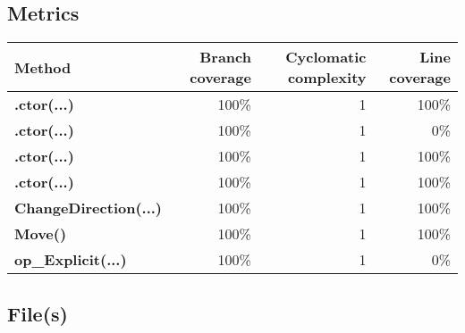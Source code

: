 \documentclass[a4paper,landscape,10pt]{article}
\begin{document}
\subsection{Metrics}
\begin{longtable}[l]{|l|r|r|r|}
\hline
\textbf{Method} & \textbf{Branch coverage} & \textbf{Cyclomatic complexity} & \textbf{Line coverage}\\
\hline
\textbf{.ctor(...)} & 100\% & 1 & 100\%\\
\hline
\textbf{.ctor(...)} & 100\% & 1 & 0\%\\
\hline
\textbf{.ctor(...)} & 100\% & 1 & 100\%\\
\hline
\textbf{.ctor(...)} & 100\% & 1 & 100\%\\
\hline
\textbf{ChangeDirection(...)} & 100\% & 1 & 100\%\\
\hline
\textbf{Move()} & 100\% & 1 & 100\%\\
\hline
\textbf{op\_Explicit(...)} & 100\% & 1 & 0\%\\
\hline
\end{longtable}
\subsection{File(s)}
\end{document}
